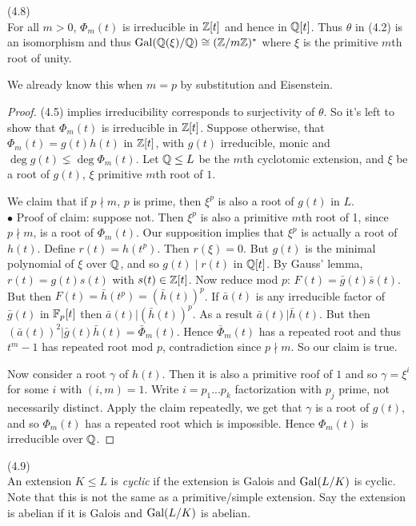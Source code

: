 \documentclass[a4paper]{article}
\begin{document}
\begin{thm} (4.8)\\
For all $m>0$, $\Phi_m(t)$ is irreducible in $\mathbb{Z}[t]$ and hence in $\mathbb{Q}[t]$. Thus $\theta$ in (4.2) is an isomorphism and thus $\operatorname{Gal}(\mathbb{Q}(\xi)/\mathbb{Q}) \cong (\mathbb{Z}/m\mathbb{Z})^*$ where $\xi$ is the primitive $m$th root of unity.
\begin{rem}
We already know this when $m=p$ by substitution and Eisenstein.
\end{rem}
\begin{proof}
(4.5) implies irreducibility corresponds to surjectivity of $\theta$. So it's left to show that $\Phi_m(t)$ is irreducible in $\mathbb{Z}[t]$. Suppose otherwise, that $\Phi_m(t) = g(t) h(t)$ in $\mathbb{Z}[t]$, with $g(t)$ irreducible, monic and $\deg g(t) \lneq \deg \Phi_m(t)$. Let $\mathbb{Q} \leq L$ be the $m$th cyclotomic extension, and $\xi$ be a root of $g(t)$, $\xi$ primitive $m$th root of $1$.

We claim that if $p \nmid m$, $p$ is prime, then $\xi^p$ is also a root of $g(t)$ in $L$.\\
$\bullet$ Proof of claim: suppose not. Then $\xi^p$ is also a primitive $m$th root of 1, since $p \nmid m$, is a root of $\Phi_m(t)$. Our supposition implies that $\xi^p$ is actually a root of $h(t)$. Define $r(t) = h(t^p)$. Then $r(\xi) = 0$. But $g(t)$ is the minimal polynomial of $\xi$ over $\mathbb{Q}$, and so $g(t) \mid r(t)$ in $\mathbb{Q}[t]$. By Gauss' lemma, $r(t) = g(t)s(t)$ with $s(t) \in \mathbb{Z}[t]$. Now reduce mod $p$: $F(t) = \bar{g}(t) \bar{s}(t)$. But then $F(t) = \bar{h}(t^p) = (\bar{h}(t))^p$. If $\bar{a}(t)$ is any irreducible factor of $\bar{g}(t)$ in $\mathbb{F}_p[t]$ then $\bar{a}(t) | (\bar{h}(t))^p$. As a result $\bar{a}(t) | \bar{h}(t)$. But then $(\bar{a}(t))^2 | \bar{g}(t) \bar{h}(t) = \bar{\Phi}_m(t)$. Hence $\bar{\Phi}_m(t)$ has a repeated root and thus $t^m-1$ has repeated root mod $p$, contradiction since $p \nmid m$. So our claim is true.

Now consider a root $\gamma$ of $h(t)$. Then it is also a primitive roof of $1$ and so $\gamma =\xi^i$ for some $i$ with $(i,m) =1$. Write $i = p_1...p_k$ factorization with $p_j$ prime, not necessarily distinct. Apply the claim repeatedly, we get that $\gamma$ is a root of $g(t)$, and so $\Phi_m(t)$ has a repeated root which is impossible. Hence $\Phi_m(t)$ is irreducible over $\mathbb{Q}$.
\end{proof}
\end{thm}

\begin{defi} (4.9)\\
An extension $K \leq L$ is \emph{cyclic} if the extension is Galois and $\operatorname{Gal}(L/K)$ is cyclic. Note that this is not the same as a primitive/simple extension. Say the extension is abelian if it is Galois and $\operatorname{Gal}(L/K)$ is abelian.
\end{defi}
\end{document}
